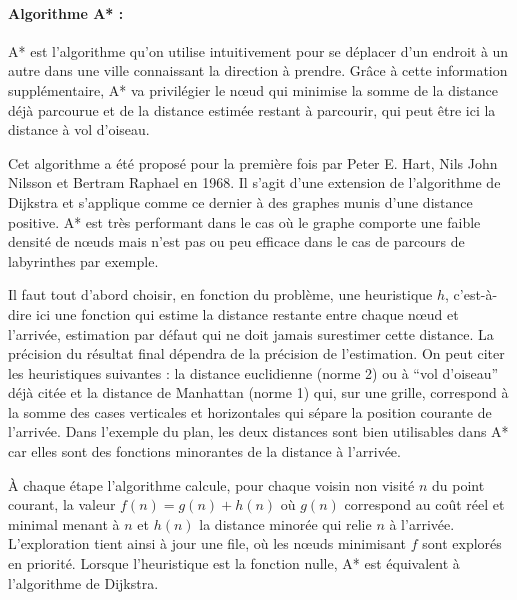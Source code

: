 %   
\paragraph{Algorithme A* : }

A* est l'algorithme qu'on utilise intuitivement pour se déplacer d'un endroit à un autre dans une ville
connaissant la direction à prendre. Grâce à cette information supplémentaire, A* va privilégier le nœud qui minimise 
la somme de la distance déjà parcourue et de la distance estimée restant à parcourir, qui peut être ici la distance à vol d'oiseau.


Cet algorithme a été proposé pour la première fois 
par Peter E. Hart, Nils John Nilsson et Bertram Raphael
en 1968. Il s'agit d'une extension de l'algorithme de Dijkstra et s'applique comme ce dernier
à des graphes munis d'une distance positive. A* est très performant dans le cas où le graphe comporte une faible densité de nœuds 
mais n'est pas ou peu efficace dans le cas de parcours de labyrinthes par exemple.


Il faut tout d'abord choisir, en fonction du problème, une heuristique $h$, c'est-à-dire ici une fonction qui estime la distance 
restante entre chaque nœud et l'arrivée, estimation par défaut qui ne doit jamais surestimer cette distance. 
La précision du résultat final dépendra de la précision de l'estimation.
On peut citer les heuristiques suivantes : la distance euclidienne (norme 2) ou à ``vol d'oiseau'' déjà citée 
et la distance de Manhattan (norme 1) qui, sur une grille, correspond à la somme des cases verticales et horizontales
qui sépare la position courante de l'arrivée. Dans l'exemple du plan, les deux distances sont bien utilisables dans A* car elles sont des fonctions minorantes de la distance à l'arrivée.

À chaque étape l'algorithme calcule, pour chaque voisin non visité $n$ du point courant, la valeur $f(n) = g(n) + h(n)$ où $g(n)$ correspond au coût réel et minimal menant à $n$ et $h(n)$ la distance minorée qui relie $n$ à l'arrivée. L'exploration tient ainsi à jour une file, où les nœuds minimisant $f$ sont explorés en priorité. Lorsque l'heuristique est la fonction nulle, A* est équivalent à l'algorithme de Dijkstra.


